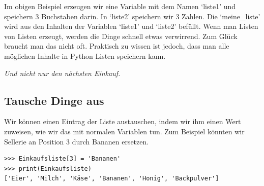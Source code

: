 Im obigen Beispiel erzeugen wir eine Variable mit dem Namen `liste1' und speichern 3 Buchstaben darin. In `liste2' speichern wir 3 Zahlen. Die `meine\_liste' wird aus den Inhalten der Variablen `liste1' und `liste2' befüllt. Wenn man Listen von Listen erzeugt, werden die Dinge schnell etwas verwirrend. Zum Glück braucht man das nicht oft. Praktisch zu wissen ist jedoch, dass man alle möglichen Inhalte in Python Listen speichern kann.

\noindent
\emph{Und nicht nur den nächsten Einkauf.}

\subsection*{\color{BrickRed}Tausche Dinge aus}

Wir können einen Eintrag der Liste austauschen, indem wir ihm einen Wert zuweisen, wie wir das mit normalen Variablen tun. Zum Beispiel könnten wir Sellerie an Position 3 durch Bananen ersetzen.

\begin{Verbatim}[frame=single]
>>> Einkaufsliste[3] = 'Bananen'
>>> print(Einkaufsliste)
['Eier', 'Milch', 'Käse', 'Bananen', 'Honig', 'Backpulver']
\end{Verbatim}

